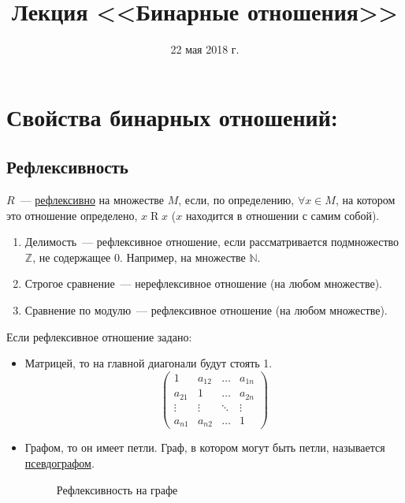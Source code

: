 \documentclass[russian]{lecture-notes}
\title{Лекция <<Бинарные отношения>>}
\date{22 мая 2018 г.}
\theoremstyle{definition}
\newcommand{\R}[2]{$#1\mathrel{R}#2$}
\begin{document}
	\maketitle

\section{Свойства бинарных отношений:}

\subsection{Рефлексивность}
\label{opr:refleks}
\begin{definition} 
	$R$~--- \underline{рефлексивно} на множестве $M$, если, по определению, $\forall x \in M$, на котором это отношение определено, \R{x}{x} ($x$ находится в отношении с самим собой).
\end{definition}

\begin{example}
	\begin{enumerate}
		\item Делимость~--- рефлексивное отношение, если рассматривается подмножество $\mathbb{Z}$, не содержащее 0. Например, на множестве $\mathbb{N}$.
		\item Строгое сравнение~--- нерефлексивное отношение (на любом множестве).
		\item Сравнение по модулю~--- рефлексивное отношение (на любом множестве).
	\end{enumerate}
\end{example}

Если рефлексивное отношение задано:
\begin{itemize}
	\item Матрицей, то на главной диагонали будут стоять 1.
	\begin{equation*}
	\left(
	\begin{array}{cccc}
	1 & a_{12} & \ldots & a_{1n}\\
	a_{21} & 1 & \ldots & a_{2n}\\
	\vdots & \vdots & \ddots & \vdots\\
	a_{n1} & a_{n2} & \ldots & 1
	\end{array}
	\right)
	\end{equation*}	
	
	\item Графом, то он имеет петли. Граф, в котором могут быть петли, называется \underline{псевдографом}.
	
	\begin{figure}[H]
		\centering
		\caption{Рефлексивность на графе}
		\label{fig:refleks}
	\end{figure}

\end{itemize}
\end{document}
